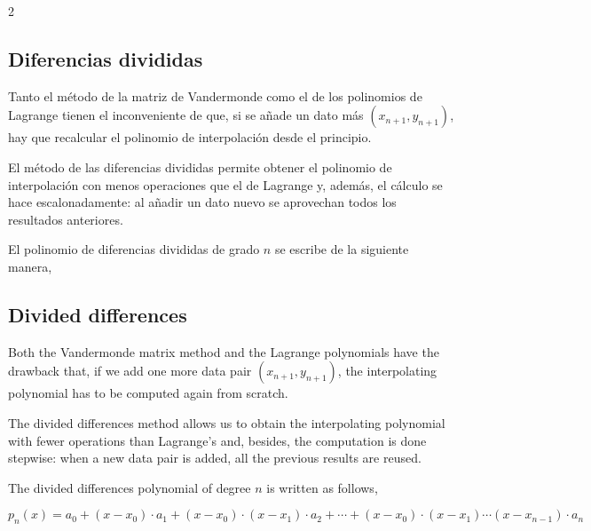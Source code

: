 \begin{paracol}{2}
\subsection{Diferencias divididas}\label{sec:difdiv}  
Tanto el método de la matriz de Vandermonde como el de los polinomios de Lagrange tienen el inconveniente de que, si se añade un dato más $(x_{n+1}, y_{n+1})$, hay que recalcular el polinomio de interpolación desde el principio.

El método de las diferencias divididas permite obtener el polinomio de interpolación con menos operaciones que el de Lagrange y, además, el cálculo se hace escalonadamente: al añadir un dato nuevo se aprovechan todos los resultados anteriores.

El polinomio de diferencias divididas de grado $n$ se escribe de la siguiente manera,
\switchcolumn
\subsection{Divided differences} 
Both the Vandermonde matrix method and the Lagrange polynomials have the drawback that, if we add one more data pair $(x_{n+1},y_{n+1})$, the interpolating polynomial has to be computed again from scratch.

The divided differences method allows us to obtain the interpolating polynomial with fewer operations than Lagrange's and, besides, the computation is done stepwise: when a new data pair is added, all the previous results are reused.

The divided differences polynomial of degree $n$ is written as follows,
\end{paracol}
\begin{equation*}
p_n(x)=a_0+(x-x_0)\cdot a_1+(x-x_0)\cdot (x-x_1)\cdot a_2+\cdots +(x-x_0)\cdot (x-x_1)\cdots (x-x_{n-1})\cdot a_n
\end{equation*}

